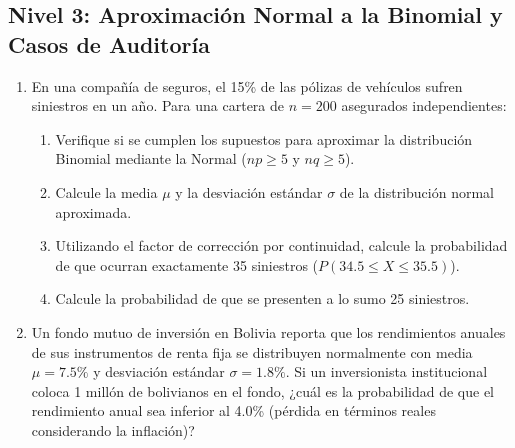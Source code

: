 \subsection*{Nivel 3: Aproximación Normal a la Binomial y Casos de Auditoría}
\begin{enumerate}[resume]
    \item En una compañía de seguros, el 15\% de las pólizas de vehículos sufren siniestros en un año. Para una cartera de $n = 200$ asegurados independientes:
    \begin{enumerate}[label=\alph*)]
        \item Verifique si se cumplen los supuestos para aproximar la distribución Binomial mediante la Normal ($np \ge 5$ y $nq \ge 5$).
        \item Calcule la media $\mu$ y la desviación estándar $\sigma$ de la distribución normal aproximada.
        \item Utilizando el factor de corrección por continuidad, calcule la probabilidad de que ocurran exactamente 35 siniestros ($P(34.5 \le X \le 35.5)$).
        \item Calcule la probabilidad de que se presenten a lo sumo 25 siniestros.
    \end{enumerate}
    \item Un fondo mutuo de inversión en Bolivia reporta que los rendimientos anuales de sus instrumentos de renta fija se distribuyen normalmente con media $\mu = 7.5\%$ y desviación estándar $\sigma = 1.8\%$. Si un inversionista institucional coloca 1 millón de bolivianos en el fondo, ¿cuál es la probabilidad de que el rendimiento anual sea inferior al 4.0\% (pérdida en términos reales considerando la inflación)?
\end{enumerate}
